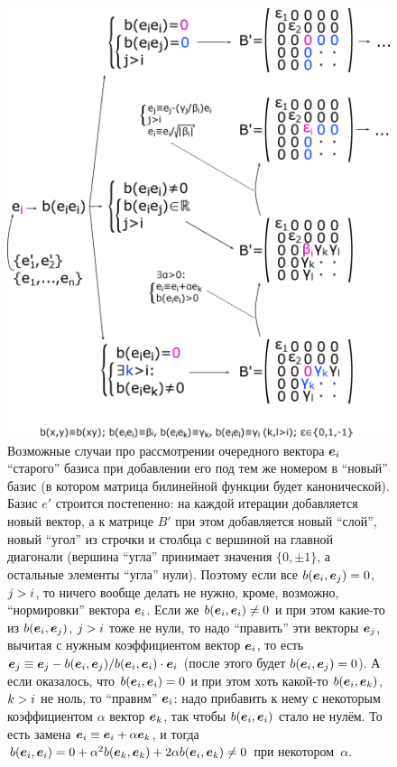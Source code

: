 \documentclass[a4paper,12pt]{article}
\begin{document}
  \begin{figure}[h!]
    \centering
  
    \includegraphics[width=0.85\columnwidth]{sym-bili-diag-scheme}
  
    \caption{Возможные случаи про рассмотрении очередного вектора $\boldsymbol e_i$ ``старого'' базиса при добавлении его под тем же номером в ``новый'' базис (в котором матрица билинейной функции будет канонической). Базис $e'$ строится постепенно: на каждой итерации добавляется новый вектор, а к матрице $B'$ при этом добавляется новый ``слой'', новый ``угол'' из строчки и столбца с вершиной на главной диагонали (вершина ``угла'' принимает значения $\{0, \pm 1\}$, а остальные элементы ``угла'' нули). Поэтому если все $b(\bds e_i, \bds e_j) \hm= 0$, $j \hm> i$, то ничего вообще делать не нужно, кроме, возможно, ``нормировки'' вектора $\boldsymbol e_i$. Если же $b(\bds e_i, \bds e_i) \hm{\not=} 0$ и при этом какие-то из $b(\boldsymbol e_i, \boldsymbol e_j)$, $j \hm> i$ тоже не нули, то надо ``править'' эти векторы $\boldsymbol e_j$, вычитая с нужным коэффициентом вектор $\boldsymbol e_i$, то есть $\bds e_j \hm\equiv \bds e_j \hm- b(\bds e_i, \bds e_j) \hm/ b(\bds e_i, \bds e_i) \hm\cdot \bds e_i$ (после этого будет $b(\bds e_i, \bds e_j) \hm= 0$). А если оказалось, что $b(\bds e_i, \bds e_i) \hm= 0$ и при этом хоть какой-то $b(\boldsymbol e_i, \boldsymbol e_k)$, $k \hm> i$ не ноль, то ``правим'' $\boldsymbol e_i$: надо прибавить к нему с некоторым коэффициентом $\alpha$ вектор $\boldsymbol e_k$, так чтобы $b(\boldsymbol e_i, \boldsymbol e_i)$ стало не нулём. То есть замена $\bds e_i \hm\equiv \bds e_i \hm+ \alpha \bds e_k$, и тогда $b(\bds e_i, \bds e_i) \hm= 0 \hm+ \alpha^2 b(\bds e_k, \bds e_k) \hm+ 2 \alpha b(\bds e_i, \bds e_k) \hm{\not=} 0$ при некотором~$\alpha$.}
    \label{fig:sym-bili-diag-scheme}
  \end{figure}
  
\end{document}
